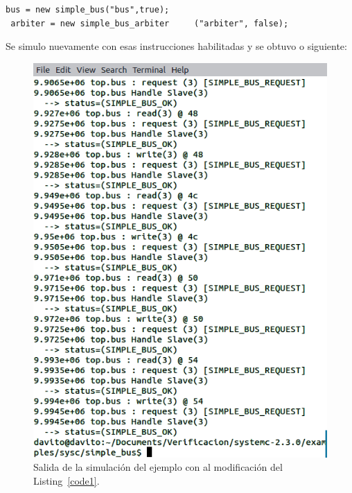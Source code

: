 \documentclass[twocolumn]{IEEEtran}
\begin{document}
\lstset{numbers=left, numberstyle=\footnotesize , stepnumber=1, numbersep=1pt}
\begin{lstlisting}[firstnumber=78, caption=Código modificado., label=code1]
 bus = new simple_bus("bus",true);
 arbiter = new simple_bus_arbiter     ("arbiter", false);
\end{lstlisting}
\noindent
Se simulo nuevamente con esas instrucciones habilitadas y se obtuvo o siguiente:
\begin{figure}[H]
  \centering
    \includegraphics[scale=0.48]{fig2.png}
  \caption{Salida de la simulación del ejemplo con al modificación del Listing~\ref{code1}.}
 \label{fig2}
\end{figure}
\end{document}
